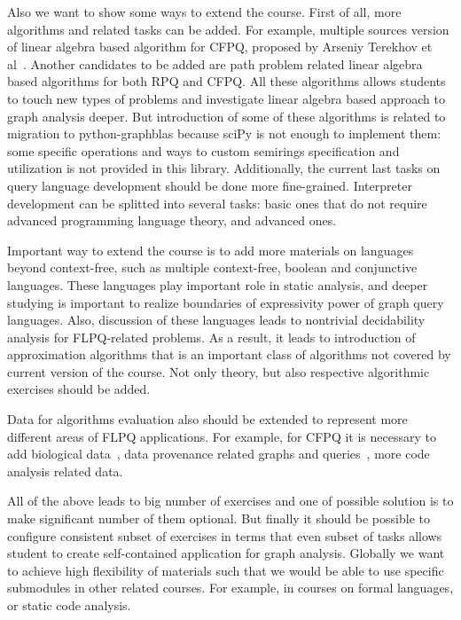 \documentclass[sigconf]{acmart}
\begin{document}
Also we want to show some ways to extend the course. 
First of all, more algorithms and related tasks can be added.
For example, multiple sources version of linear algebra based algorithm for CFPQ, proposed by Arseniy Terekhov et al~\cite{terekhov2021multiple}.
Another candidates to be added are path problem related linear algebra based algorithms for both RPQ and CFPQ.
All these algorithms allows students to touch new types of problems and investigate linear algebra based approach to graph analysis deeper.
But introduction of some of these algorithms is related to migration to python-graphblas because sciPy is not enough to implement them: some specific operations and ways to custom semirings specification and utilization is not provided in this library.
Additionally, the current last tasks on query language development should be done more fine-grained. 
Interpreter development can be splitted into several tasks: basic ones that do not require advanced programming language theory, and advanced ones.

Important way to extend the course is to add more materials on languages beyond context-free, such as multiple context-free, boolean and conjunctive languages. 
These languages play important role in static analysis, and deeper studying is important to realize boundaries of expressivity power of graph query languages.
Also, discussion of these languages leads to nontrivial decidability analysis for FLPQ-related problems.
As a result, it leads to introduction of approximation algorithms that is an important class of algorithms not covered by current version of the course.
Not only theory, but also respective algorithmic exercises should be added.

Data for algorithms evaluation also should be extended to represent more different areas of FLPQ applications.
For example, for CFPQ it is necessary to add biological data~\cite{SevonEronen+2008+157+172}, data provenance related graphs and queries~\cite{8731467}, more code analysis related data.

All of the above leads to big number of exercises and one of possible solution is to make significant number of them optional.
But finally it should be possible to configure consistent subset of exercises in terms that even subset of tasks allows student to create self-contained application for graph analysis.
Globally we want to achieve high flexibility of materials such that we would be able to use specific submodules in other related courses.
For example, in courses on formal languages, or static code analysis.




\end{document}
